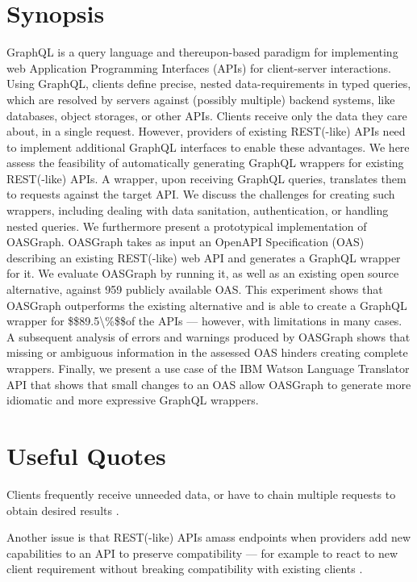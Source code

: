 \section{Synopsis}
\label{s:Synopsis-1}
GraphQL is a query language and thereupon-based paradigm for implementing web
Application Programming Interfaces (APIs) for client-server interactions. Using
GraphQL, clients define precise, nested data-requirements in typed queries,
which are resolved by servers against (possibly multiple) backend systems, like
databases, object storages, or other APIs. Clients receive only the data they
care about, in a single request. However, providers of existing REST(-like) APIs
need to implement additional GraphQL interfaces to enable these advantages. We
here assess the feasibility of automatically generating GraphQL wrappers for
existing REST(-like) APIs. A wrapper, upon receiving GraphQL queries, translates
them to requests against the target API\@. We discuss the challenges for
creating such wrappers, including dealing with data sanitation, authentication,
or handling nested queries. We furthermore present a prototypical implementation
of OASGraph. OASGraph takes as input an OpenAPI Specification (OAS) describing
an existing REST(-like) web API and generates a GraphQL wrapper for it. We
evaluate OASGraph by running it, as well as an existing open source alternative,
against 959 publicly available OAS\@. This experiment shows that OASGraph
outperforms the existing alternative and is able to create a GraphQL wrapper for
\$\$89.5\textbackslash \%\$\$of the APIs --- however, with limitations in many
cases. A subsequent analysis of errors and warnings produced by OASGraph shows
that missing or ambiguous information in the assessed OAS hinders creating
complete wrappers. Finally, we present a use case of the IBM Watson Language
Translator API that shows that small changes to an OAS allow OASGraph to
generate more idiomatic and more expressive GraphQL wrappers.

\section{Useful Quotes}
\label{s:Useful-Quotes-1}
Clients frequently receive unneeded data, or have to chain multiple requests to
obtain desired results \citep{witternGeneratingGraphQLWrappersREST2018}.

Another issue is that REST(-like) APIs amass endpoints when providers add new
capabilities to an API to preserve compatibility --- for example to react to new
client requirement without breaking compatibility with existing clients
\citep{witternGeneratingGraphQLWrappersREST2018}.

